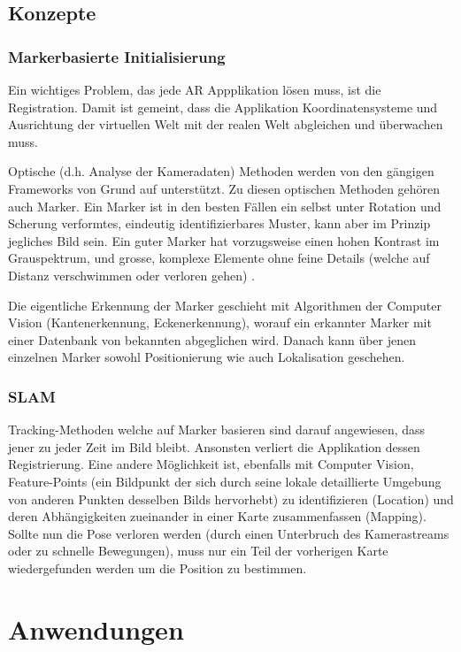 \documentclass[a4paper]{scrreprt}
\begin{document}
\subsection{Konzepte}

\subsubsection{Markerbasierte Initialisierung}
Ein wichtiges Problem, das jede AR Appplikation lösen muss, ist die Registration. Damit ist gemeint, dass die Applikation Koordinatensysteme und Ausrichtung der virtuellen Welt mit der realen Welt abgleichen und überwachen muss.

Optische (d.h. Analyse der Kameradaten) Methoden werden von den gängigen Frameworks von Grund auf unterstützt. Zu diesen optischen Methoden gehören auch Marker. Ein Marker ist in den besten Fällen ein selbst unter Rotation und Scherung verformtes, eindeutig identifizierbares Muster, kann aber im Prinzip jegliches Bild sein. Ein guter Marker hat vorzugsweise einen hohen Kontrast im Grauspektrum, und grosse, komplexe Elemente ohne feine Details (welche auf Distanz verschwimmen oder verloren gehen) \cite{Kudan2016}.

Die eigentliche Erkennung der Marker geschieht mit Algorithmen der Computer Vision (Kantenerkennung, Eckenerkennung), worauf ein erkannter Marker mit einer Datenbank von bekannten abgeglichen wird. Danach kann über jenen einzelnen Marker sowohl Positionierung wie auch Lokalisation geschehen.

\subsubsection{SLAM}
Tracking-Methoden welche auf Marker basieren sind darauf angewiesen, dass jener zu jeder Zeit im Bild bleibt. Ansonsten verliert die Applikation dessen Registrierung. Eine andere Möglichkeit ist, ebenfalls mit Computer Vision, Feature-Points (ein Bildpunkt der sich durch seine lokale detaillierte Umgebung von anderen Punkten desselben Bilds hervorhebt) zu identifizieren (Location) und deren Abhängigkeiten zueinander in einer Karte zusammenfassen (Mapping). Sollte nun die Pose verloren werden (durch einen Unterbruch des Kamerastreams oder zu schnelle Bewegungen), muss nur ein Teil der vorherigen Karte wiedergefunden werden um die Position zu bestimmen.

\section{Anwendungen}
\end{document}
